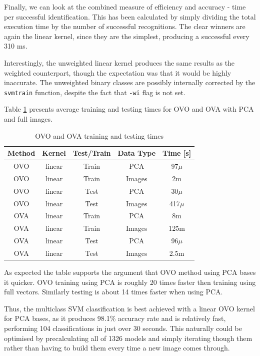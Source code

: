 \documentclass[10pt,twocolumn,letterpaper]{article}
\begin{document}
Finally, we can look at the combined measure of efficiency and accuracy - time per successful identification. This has been calculated by simply dividing the total execution time by the number of successful recognitions. The clear winners are again the linear kernel, since they are the simplest, producing a successful  every 310 ms. 

Interestingly, the unweighted linear kernel produces the same results as the weighted counterpart, though the expectation was that it would be highly inaccurate. The unweighted binary classes are possibly internally corrected by the {\tt\small svmtrain} function, despite the fact that {\tt\small -wi} flag is not set.

Table \ref{tab:idvTimes} presents average training and testing times for OVO and OVA with PCA and full images.

\begin{table}[H]
\begin{center}
\caption{OVO and OVA training and testing times}  \label{tab:idvTimes}
\small
\begin{tabular}{||c c c c c||}
\hline
\bf Method & \bf Kernel & \bf Test/Train & \bf Data Type & \bf Time [s]\\ [0.5ex]
\hline \hline
OVO & linear & Train & PCA & 97$\mu$\\ [0.5ex]
\hline
OVO & linear & Train & Images & 2m\\ [0.5ex]
\hline
OVO & linear & Test & PCA & 30$\mu$\\ [0.5ex]
\hline
OVO & linear & Test & Images & 417$\mu$\\ [0.5ex]
\hline \hline
OVA & linear & Train & PCA & 8m\\ [0.5ex]
\hline
OVA & linear & Train & Images & 125m\\ [0.5ex]
\hline
OVA & linear & Test & PCA & 96$\mu$\\ [0.5ex]
\hline
OVA & linear & Test & Images & 2.5m\\ [0.5ex]
\hline
\end{tabular}
\end{center}

\end{table}

As expected the table supports the argument that OVO method using PCA bases it quicker. OVO training using PCA is roughly 20 times faster then training using full vectors. Similarly testing is about 14 times faster when using PCA.

Thus, the multiclass SVM classification is best achieved with a linear OVO kernel for PCA bases, as it produces 98.1\% accuracy rate and is relatively fast, performing 104 classifications in just over 30 seconds. This naturally could be optimised by precalculating all of 1326 models and simply iterating though them rather than having to build them every time a new image comes through.
\end{document}
